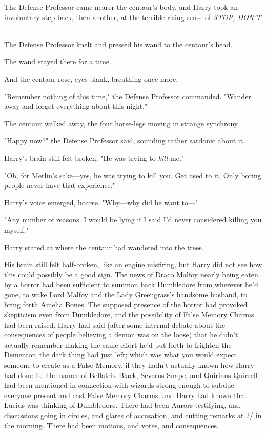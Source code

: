 The Defense Professor came nearer the centaur's body, and Harry took an
involuntary step back, then another, at the terrible rising sense of
\emph{STOP, DON'T---}

The Defense Professor knelt and pressed his wand to the centaur's head.

The wand stayed there for a time.

And the centaur rose, eyes blank, breathing once more.

"Remember nothing of this time," the Defense Professor commanded. "Wander away
and forget everything about this night."

The centaur walked away, the four horse-legs moving in strange synchrony.

"Happy now?" the Defense Professor said, sounding rather sardonic about it.

Harry's brain still felt broken. "He was trying to \emph{kill} me."

"Oh, for Merlin's sake---yes, he was trying to kill you. Get used to it. Only
boring people never have that experience."

Harry's voice emerged, hoarse. "Why---why did he want to\mbox{---}"

"Any number of reasons. I would be lying if I said I'd never considered killing
you myself."

Harry stared at where the centaur had wandered into the trees.

His brain still felt half-broken, like an engine misfiring, but Harry did not
see how this could possibly be a good sign.
\sbreak
The news of Draco Malfoy nearly being eaten by a horror had been sufficient to
summon back Dumbledore from wherever he'd gone, to wake Lord Malfoy and the
Lady Greengrass's handsome husband, to bring forth Amelia Bones. The supposed
presence of the horror had provoked skepticism even from Dumbledore, and the
possibility of False Memory Charms had been raised. Harry had said (after some
internal debate about the consequences of people believing a demon was on the
loose) that he didn't actually remember making the same effort he'd put forth
to frighten the Dementor, the dark thing had just left; which was what you
would expect someone to create as a False Memory, if they hadn't actually known
how Harry had done it. The names of Bellatrix Black, Severus Snape, and
Quirinus Quirrell had been mentioned in connection with wizards strong enough
to subdue everyone present and cast False Memory Charms, and Harry had known
that Lucius was thinking of Dumbledore. There had been Aurors testifying, and
discussions going in circles, and glares of accusation, and cutting remarks at
2\AM/ in the morning. There had been motions, and votes, and consequences.

